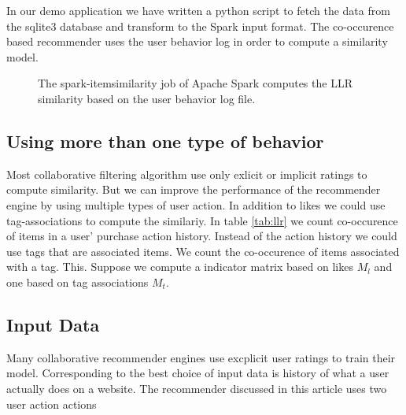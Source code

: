 In our demo application we have written a python script to fetch the data from the sqlite3 database and transform to the Spark input format.
The co-occurence based recommender uses the user behavior log in order to compute a similarity model. 

\begin{figure}
\centering
{}
\caption{The {\ttfamily spark-itemsimilarity} job of Apache Spark computes the LLR similarity based on the user behavior log file.}
\end{figure}


\subsection{Using more than one type of behavior}
\label{sec:multimodal}

Most collaborative filtering algorithm use only exlicit or implicit ratings to compute similarity.
But we can improve the performance of the recommender engine by using multiple types of user action. In addition to likes we could use tag-associations to compute the similariy. In table \ref{tab:llr} we count co-occurence of items in a user' purchase action history. Instead of the action history we could use tags that are associated items. We count the co-occurence of items associated with a tag. This. Suppose we compute a indicator matrix based on likes $M_l$ and one based on tag associations $M_t$.

\subsection{Input Data}
\label{sec:inputdata}

Many collaborative recommender engines use excplicit user ratings to train their model. Corresponding to \cite{Dunning14} the best choice of input data is history of what a user actually does on a website. The recommender discussed in this article uses two user action actions

